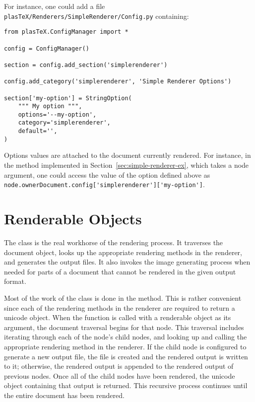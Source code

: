 For instance, one could add a file
\verb+plasTeX/Renderers/SimpleRenderer/Config.py+ containing:

\begin{verbatim}
from plasTeX.ConfigManager import *

config = ConfigManager()

section = config.add_section('simplerenderer')

config.add_category('simplerenderer', 'Simple Renderer Options')

section['my-option'] = StringOption(
    """ My option """,
    options='--my-option',
    category='simplerenderer',
    default='',
)
\end{verbatim}

Options values are attached to the document currently rendered. For
instance, in the  method implemented in
Section~\ref{sec:simple-renderer-ex}, which takes a node argument, one
could access the value of the option defined above as
\verb+node.ownerDocument.config['simplerenderer']['my-option']+.


\section{Renderable Objects\label{sec:renderable}}

The  class is the real workhorse of the rendering process.
It traverses the document object, looks up the appropriate rendering
methods in the renderer, and generates the output files.  It also 
invokes the image generating process when needed for parts of a document
that cannot be rendered in the given output format.

Most of the work of the  class is done in the 
 method.  This is rather convenient since each of
the rendering methods in the renderer are required to return a unicode
object.  When the  function is called with a renderable
object as its argument, the document traversal begins for that node.
This traversal includes iterating through each of the node's child nodes, and
looking up and calling the appropriate rendering method in the renderer.
If the child node is configured to generate a new output file, the 
file is created and the rendered output is written to it; otherwise,
the rendered output is appended to the rendered output of previous nodes.
Once all of the child nodes have been rendered, the unicode object containing
that output is returned.  This recursive process continues until the 
entire document has been rendered.


